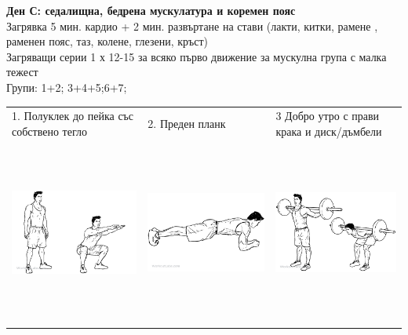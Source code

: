 \documentclass{article}
\begin{document}
\newpage
\textbf{Ден С: седалищна, бедрена мускулатура и коремен пояс}\\
Загрявка 5 мин. кардио + 2 мин. развъртане на стави (лакти, китки, рамене ,
раменен пояс, таз, колене, глезени, кръст)\\
Загряващи серии 1 х 12-15 за всяко първо движение за мускулна група с малка
тежест\\
Групи: 1+2; 3+4+5;6+7;\\ 
\begin{tabular}{ | m{5cm} | m{5cm} | m{5cm} | }
\hline
1. Полуклек до пейка със собствено тегло & 
2. Преден планк   & 
3  Добро утро с прави крака и диск/дъмбели\\ 
\begin{minipage}{5cm} \includegraphics[width=\linewidth, height=60mm]{day_C_ex_1_Air_Squats.png} \end{minipage}&
\begin{minipage}{5cm} \includegraphics[width=\linewidth, height=60mm]{day_C_ex_2_front-plank.png} \end{minipage}& 
\begin{minipage}{5cm} \includegraphics[width=\linewidth, height=60mm]{day_C_ex_3_Barbell_Good_Morning.png} \end{minipage}\\ 

\end{tabular}
\end{document}
